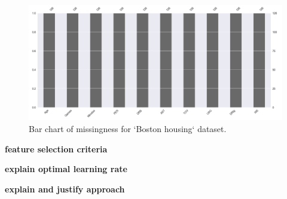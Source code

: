 \documentclass[letterpaper,12pt,twoside,]{pinp}
\begin{document}
\begin{figure}
\includegraphics[width=1\linewidth]{miss_house.png}
\centering
\caption{Bar chart of missingness for `Boston housing` dataset.}
\label{fig:missHouse}
\end{figure}

\textbf{feature selection criteria}

\textbf{explain optimal learning rate}

\textbf{explain and justify approach}





\end{document}
